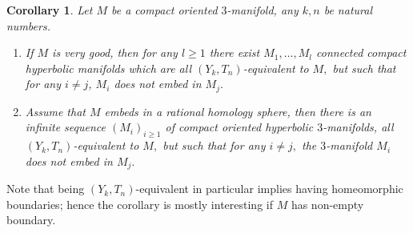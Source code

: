 \documentclass[12pt]{amsart}
\newtheorem{cor}[thm]{Corollary}
\theoremstyle{definition}
\begin{document}
\begin{cor}\label{cor:pairwiseNotEmbedding}
	Let $M$ be a compact oriented $3$-manifold, any $k,n$ be natural numbers.
	\begin{enumerate}
		\item If $M$ is very good, then for any $l\geq 1$ there exist $M_1,\dots, M_l$ connected compact hyperbolic manifolds which are all $(Y_k,T_n)$-equivalent to $M,$ but such that for any $i\neq j$, $M_i$ does not embed in $M_j.$
		\item Assume that $M$ embeds in a rational homology sphere, then there is an infinite sequence $(M_i)_{i\geq 1}$ of compact oriented hyperbolic $3$-manifolds, all $(Y_k,T_n)$-equivalent to $M,$ but such that for any $i\neq j,$ the $3$-manifold $M_i$ does not embed in $M_j.$
	\end{enumerate}
	
	
	
\end{cor}
Note that being $(Y_k,T_n)$-equivalent in particular implies having homeomorphic boundaries; hence the corollary is mostly interesting if $M$ has non-empty boundary.
\end{document}
